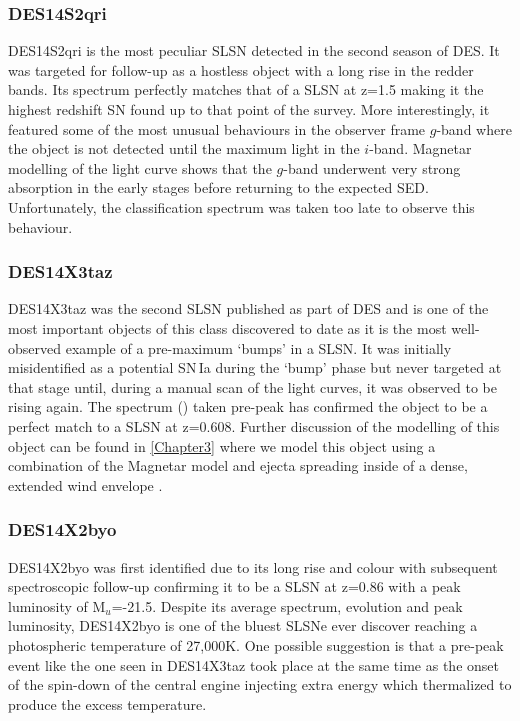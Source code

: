 \subsubsection{DES14S2qri}
DES14S2qri is the most peculiar SLSN detected in the second season of DES. It was targeted for follow-up as a hostless object with a long rise in the redder bands. Its spectrum perfectly matches that of a SLSN at z=1.5 making it the highest redshift SN found up to that point of the survey. More interestingly, it featured some of the most unusual behaviours in the observer frame $g$-band where the object is not detected until the maximum light in the $i$-band. Magnetar modelling of the light curve shows that the $g$-band underwent very strong absorption in the early stages before returning to the expected SED. Unfortunately, the classification spectrum was taken too late to observe this behaviour.

\subsubsection{DES14X3taz}
DES14X3taz was the second SLSN published as part of DES and is one of the most important objects of this class discovered to date as it is the most well-observed example of a pre-maximum `bumps' in a SLSN. It was initially misidentified as a potential SN\,Ia during the `bump' phase but never targeted at that stage until, during a manual scan of the light curves, it was observed to be rising again. The spectrum () taken pre-peak has confirmed the object to be a perfect match to a SLSN at z=0.608. Further discussion of the modelling of this object can be found in \cref{Chapter3} where we model this object using a combination of the Magnetar model and ejecta spreading inside of a dense, extended wind envelope \citep{Piro2015}.

\subsubsection{DES14X2byo}
DES14X2byo was first identified due to its long rise and colour with subsequent spectroscopic follow-up confirming it to be a SLSN at z=0.86 with a peak luminosity of M$_u$=-21.5. Despite its average spectrum, evolution and peak luminosity, DES14X2byo is one of the bluest SLSNe ever discover reaching a photospheric temperature of 27,000K. One possible suggestion is that a pre-peak event like the one seen in DES14X3taz took place at the same time as the onset of the spin-down of the central engine injecting extra energy which thermalized to produce the excess temperature.


